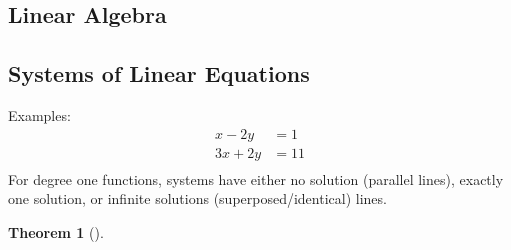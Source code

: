 \documentclass{article}
\newtheorem{theorem}{Theorem}
\begin{document}
    \begin{spacing}{1.2}
    \newpage
        \section{Linear Algebra}
        \subsection{Systems of Linear Equations}
        Examples:
        \begin{align*}
            x - 2y &= 1 \\
            3x + 2y &= 11\\
        \end{align*}
        For degree one functions, systems have either no solution (parallel lines), exactly one solution, or infinite solutions (superposed/identical) lines.

        \begin{theorem}[]
            
        \end{theorem}
    \end{spacing}
    
\end{document}
